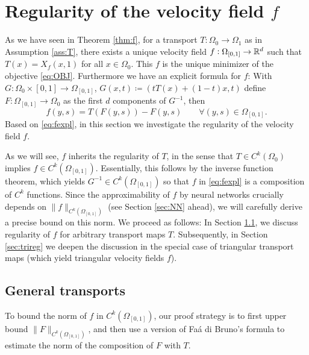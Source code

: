 \section{%
  Regularity of the velocity field $f$}\label{sec:regularity}
 As we have seen in Theorem \ref{thm:f}, for a transport
  $T:\Omega_0\to\Omega_1$ as in Assumption \ref{ass:T}, there exists a
  unique velocity field $f:\Omega_{[0,1]}\to\mathbb{R}^d$ such that
  $T(x)=X_f(x,1)$ for all $x\in\Omega_0$. This $f$ is the unique
  minimizer of the objective \eqref{eq:OBJ}. Furthermore we have an
  explicit formula for $f$: With
  $G:\Omega_0\times [0,1]\to\Omega_{[0,1]}$,
  $G(x,t)  \coloneqq  (tT(x) + (1-t)x, t)$ define $F:\Omega_{[0,1]}\to\Omega_0$
  as the first $d$ components of $G^{-1}$, then
  \begin{equation}\label{eq:fexpl}
    f(y,s) = T(F(y,s)) - F(y,s)\qquad\forall (y,s)\in\Omega_{[0,1]}.
  \end{equation}
  Based on \eqref{eq:fexpl}, in this section we investigate the
  regularity of the velocity field $f$.

  As we will see, $f$ inherits the regularity of $T$, in the sense
  that $T\in C^k(\Omega_0)$ implies $f\in
  C^k(\Omega_{[0,1]})$. Essentially, this follows by the inverse
  function theorem, which yields $G^{-1}\in C^k(\Omega_{[0,1]})$ so
  that $f$ in \eqref{eq:fexpl} is a composition of $C^k$
  functions. Since the approximability of $f$ by neural networks
  crucially depends on $\|f\|_{C^k(\Omega_{[0,1]})}$ (see Section
  \ref{sec:NN} ahead), we will carefully derive a precise bound on
  this norm. We proceed as follows: In Section \ref{sec:genreg}, we
  discuss regularity of $f$ for arbitrary transport maps
  $T$. Subsequently, in Section \ref{sec:trireg} we deepen the
  discussion in the special case of triangular transport maps (which
  yield triangular velocity fields $f$).





\subsection{General transports}\label{sec:genreg}
To bound the norm of $f$ in $C^k(\Omega_{[0,1]})$, our proof
  strategy is to first upper bound $\|F\|_{C^k(\Omega_{[0,1]})}$, and
  then use a version of Fa\'{a} di Bruno's formula to estimate the
  norm of the composition of $F$ with $T$.


